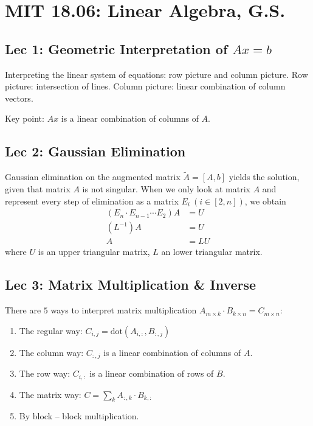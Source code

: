 \section{MIT 18.06: Linear Algebra, G.S.}

\subsection{Lec 1: Geometric Interpretation of $Ax=b$}

Interpreting the linear system of equations: row picture and column picture.
Row picture: intersection of lines. Column picture: linear combination of
column vectors.

Key point: $Ax$ is a linear combination of columns of $A$.

\subsection{Lec 2: Gaussian Elimination}

Gaussian elimination on the augmented matrix $\tilde{A}=[A,b]$ yields
the solution, given that matrix $A$ is not singular. When we only look
at matrix $A$ and represent every step of elimination as a matrix
$E_i~(i\in [2,n])$, we obtain
\begin{align}
	( E_n \cdot E_{n-1} \cdots E_2 ) A &= U \\
	(L^{-1}) A &= U \\
	A &= LU
\end{align}
where $U$ is an upper triangular matrix, $L$ an lower triangular matrix.

\subsection{Lec 3: Matrix Multiplication & Inverse}

There are $5$ ways to interpret matrix multiplication
$A_{m\times k} \cdot B_{k\times n} = C_{m\times n}$:
\begin{enumerate}
	\item The regular way: $C_{i,j} = \text{dot}(A_{i,:},B_{:,j})$
	\item The column way: $C_{:,j}$ is a linear combination of columns of $A$.
	\item The row way: $C_{i,:}$ is a linear combination of rows of $B$.
	\item The matrix way: $C = \sum_k A_{:,k} \cdot B_{k,:}$
	\item By block -- block multiplication.
\end{enumerate}

